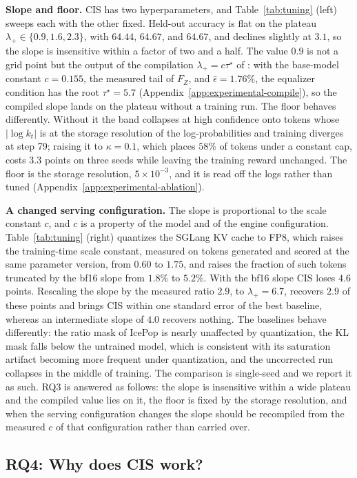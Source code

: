 \noindent\textbf{Slope and floor.}
CIS has two hyperparameters, and Table~\ref{tab:tuning} (left) sweeps each with the other fixed. Held-out accuracy is flat on the plateau $\lambda_+\in\{0.9,1.6,2.3\}$, with $64.44$, $64.67$, and $64.67$, and declines slightly at $3.1$, so the slope is insensitive within a factor of two and a half. The value $0.9$ is not a grid point but the output of the compilation $\lambda_+=c\tau^\star$ of : with the base-model constant $c=0.155$, the measured tail of $F_Z$, and $\hat\epsilon=1.76\%$, the equalizer condition has the root $\tau^\star=5.7$ (Appendix~\ref{app:experimental-compile}), so the compiled slope lands on the plateau without a training run. The floor behaves differently. Without it the band collapses at high confidence onto tokens whose $|\log k_t|$ is at the storage resolution of the log-probabilities and training diverges at step 79; raising it to $\kappa=0.1$, which places $58\%$ of tokens under a constant cap, costs $3.3$ points on three seeds while leaving the training reward unchanged. The floor is the storage resolution, $5\times10^{-3}$, and it is read off the logs rather than tuned (Appendix~\ref{app:experimental-ablation}).

\noindent\textbf{A changed serving configuration.}
The slope is proportional to the scale constant $c$, and $c$ is a property of the model and of the engine configuration. Table~\ref{tab:tuning} (right) quantizes the SGLang KV cache to FP8, which raises the training-time scale constant, measured on tokens generated and scored at the same parameter version, from $0.60$ to $1.75$, and raises the fraction of such tokens truncated by the bf16 slope from $1.8\%$ to $5.2\%$. With the bf16 slope CIS loses $4.6$ points. Rescaling the slope by the measured ratio $2.9$, to $\lambda_+=6.7$, recovers $2.9$ of these points and brings CIS within one standard error of the best baseline, whereas an intermediate slope of $4.0$ recovers nothing. The baselines behave differently: the ratio mask of IcePop is nearly unaffected by quantization, the KL mask falls below the untrained model, which is consistent with its saturation artifact becoming more frequent under quantization, and the uncorrected run collapses in the middle of training. The comparison is single-seed and we report it as such. RQ3 is answered as follows: the slope is insensitive within a wide plateau and the compiled value lies on it, the floor is fixed by the storage resolution, and when the serving configuration changes the slope should be recompiled from the measured $c$ of that configuration rather than carried over.

\subsection{RQ4: Why does CIS work?}
\label{sec:experiments-why}

